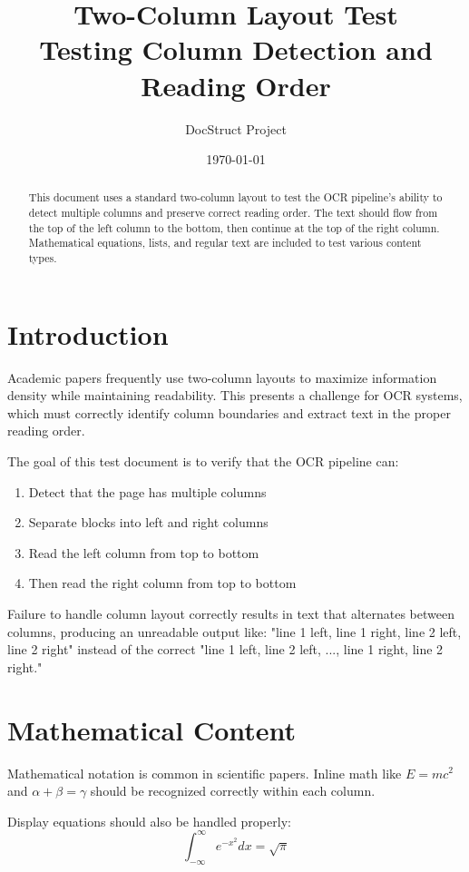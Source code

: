\documentclass[10pt,twocolumn]{article}
\title{\textbf{Two-Column Layout Test}\\\large Testing Column Detection and Reading Order}
\author{DocStruct Project}
\date{\today}
\begin{document}
\maketitle

\begin{abstract}
This document uses a standard two-column layout to test the OCR pipeline's ability to detect multiple columns and preserve correct reading order. The text should flow from the top of the left column to the bottom, then continue at the top of the right column. Mathematical equations, lists, and regular text are included to test various content types.
\end{abstract}

\section{Introduction}

Academic papers frequently use two-column layouts to maximize information density while maintaining readability. This presents a challenge for OCR systems, which must correctly identify column boundaries and extract text in the proper reading order.

The goal of this test document is to verify that the OCR pipeline can:
\begin{enumerate}
\item Detect that the page has multiple columns
\item Separate blocks into left and right columns
\item Read the left column from top to bottom
\item Then read the right column from top to bottom
\end{enumerate}

Failure to handle column layout correctly results in text that alternates between columns, producing an unreadable output like: "line 1 left, line 1 right, line 2 left, line 2 right" instead of the correct "line 1 left, line 2 left, ..., line 1 right, line 2 right."

\section{Mathematical Content}

Mathematical notation is common in scientific papers. Inline math like $E = mc^2$ and $\alpha + \beta = \gamma$ should be recognized correctly within each column.

Display equations should also be handled properly:
\begin{equation}
\int_{-\infty}^{\infty} e^{-x^2} dx = \sqrt{\pi}
\end{equation}
\end{document}

